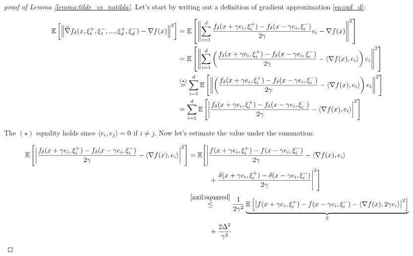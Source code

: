     \begin{proof}[proof of Lemma \ref{lemma:tilde_vs_notilda}]
        Let's start by writing out a definition of gradient approximation \eqref{eq:opf_d}:
        
        \begin{equation*}
        \begin{split}
            \mathbb{E}\left[ \left\| \widetilde{\nabla}f_{\delta}(x, \xi^+_1, \xi^-_1, ... , \xi_d^+, \xi_d^-) - \nabla f(x) \right\|^2 \right]
            &= 
            \mathbb{E}\left[ \left\| \sum\limits_{i = 1}^d \frac{f_{\delta}(x + \gamma e_i, \xi^+_i) - f_{\delta}(x - \gamma e_i, \xi^-_i)}{2 \gamma}e_i - \nabla f(x) \right\|^2 \right]
            \\&= 
            \mathbb{E}\left[ \left\| \sum\limits_{i = 1}^d \left(\frac{f_{\delta}(x + \gamma e_i, \xi^+_i) - f_{\delta}(x - \gamma e_i, \xi^-_i)}{2 \gamma} - \left\langle \nabla f(x),e_i \right\rangle \right) e_i \right\|^2 \right]
            \\&\overset{(\star)}{=}
            \sum\limits_{i = 1}^d \mathbb{E}\left[ \left\| \left(\frac{f_{\delta}(x + \gamma e_i, \xi^+_i) - f_{\delta}(x - \gamma e_i, \xi^-_i)}{2 \gamma} - \left\langle \nabla f(x),e_i \right\rangle \right) e_i \right\|^2 \right]
            \\&=
            \sum\limits_{i = 1}^d \mathbb{E}\left[ \left|\frac{f_{\delta}(x + \gamma e_i, \xi^+_i) - f_{\delta}(x - \gamma e_i, \xi^-_i)}{2 \gamma} - \left\langle \nabla f(x),e_i \right\rangle \right|^2 \right]
    \end{split}
    \end{equation*}

    The $(\star)$ equality holds since $\left\langle e_i,e_j \right\rangle = 0$ if $i \neq j$. Now let's estimate the value under the summation:

    \begin{equation*}
    \begin{split}
        \expect{\left|\frac{f_{\delta}(x + \gamma e_i, \xi^+_i) - f_{\delta}(x - \gamma e_i, \xi^-_i)}{2 \gamma} - \dotprod{\nabla f(x)}{e_i} \right|^2} 
        &= 
        \mathbb{E}\Bigg[ \Bigg|\frac{f(x + \gamma e_i, \xi^+_i) - f(x - \gamma e_i, \xi^-_i)}{2 \gamma} - \dotprod{\nabla f(x)}{e_i}
        \\&\qquad\quad+ 
        \frac{\delta(x + \gamma e_i, \xi^+_i) - \delta(x - \gamma e_i, \xi^-_i)}{2 \gamma}\Bigg|^2 \Bigg]
        \\&\overset{\ref{axil:squared}}{\leq}
        \frac{1}{2 \gamma^2} \underbrace{\expect{\left|f(x + \gamma e_i, \xi^+_i) - f(x - \gamma e_i, \xi^-_i) - \dotprod{\nabla f(x)}{2 \gamma e_i} \right|^2}}_{\circledOne}
        \\&\qquad\quad+ 
        \frac{2 \Delta^2}{\gamma^2}
    \end{split}
    \end{equation*}


\end{proof}
